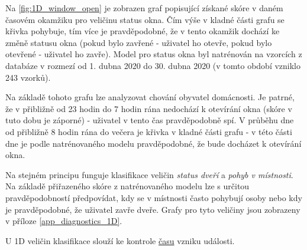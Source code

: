 Na \cref{fig:1D_window_open} je zobrazen graf popisující získané skóre v daném časovém okamžiku pro veličinu status okna. Čím výše v kladné části grafu se křivka pohybuje, tím více je pravděpodobné, že v tento okamžik dochází ke změně statusu okna (pokud bylo zavřené - uživatel ho otevře, pokud bylo otevřené - uživatel ho zavře). Model pro status okna byl natrénován na vzorcích z databáze v rozmezí od 1. dubna 2020 do 30. dubna 2020 (v tomto období vzniklo 243 vzorků). \par
Na základě tohoto grafu lze analyzovat chování obyvatel domácnosti. Je patrné, že v přibližně od 23 hodin do 7 hodin rána nedochází k otevírání okna (skóre v tuto dobu je záporné) - uživatel v tento čas pravděpodobně spí. V průběhu dne od přibližně 8 hodin rána do večera je křivka v kladné části grafu - v této části dne je podle natrénovaného modelu pravděpodobné, že bude docházet k otevírání okna. \par
Na stejném principu funguje klasifikace veličin \textit{status dveří} a \textit{pohyb v místnosti}. Na základě přiřazeného skóre z natrénovaného modelu lze s určitou pravděpodobností předpovídat, kdy se v místnosti často pohybují osoby nebo kdy je pravděpodobné, že uživatel zavře dveře. Grafy pro tyto veličiny jsou zobrazeny v příloze \ref{app_diagnostics_1D}. \par
U 1D veličin klasifikace slouží ke kontrole \underline{času} vzniku události.

